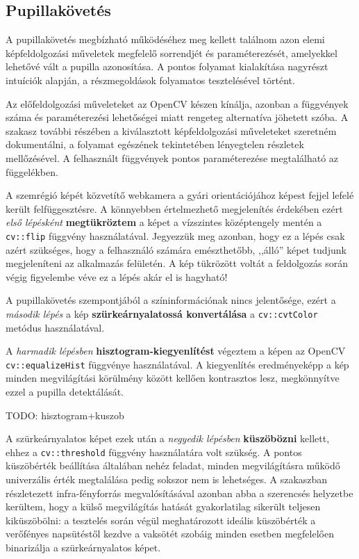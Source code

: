 \subsection{Pupillakövetés}\label{sect:pupillakov}

A pupillakövetés megbízható működéséhez meg kellett találnom azon elemi képfeldolgozási műveletek megfelelő sorrendjét és paraméterezését, amelyekkel lehetővé vált a pupilla azonosítása. A pontos folyamat kialakítása nagyrészt intuíciók alapján, a részmegoldások folyamatos tesztelésével történt.

Az előfeldolgozási műveleteket az OpenCV készen kínálja, azonban a függvények száma és paraméterezési lehetőségei miatt rengeteg alternatíva jöhetett szóba. A szakasz további részében a kiválasztott képfeldolgozási műveleteket szeretném dokumentálni, a folyamat egészének tekintetében lényegtelen részletek mellőzésével. A felhasznált függvények pontos paraméterezése megtalálható az  függelékben.

\bigskip

A szemrégió képét közvetítő webkamera a gyári orientációjához képest fejjel lefelé került felfüggesztésre. A könnyebben értelmezhető megjelenítés érdekében ezért \emph{első lépésként} \textbf{megtükröztem} a képet a vízszintes középtengely mentén a \texttt{cv::flip} függvény használatával. Jegyezzük meg azonban, hogy ez a lépés csak azért szükséges, hogy a felhasználó számára emészthetőbb, ,,álló'' képet tudjunk megjeleníteni az alkalmazás felületén. A kép tükrözött voltát a feldolgozás során végig figyelembe véve ez a lépés akár el is hagyható!

A pupillakövetés szempontjából a színinformációnak nincs jelentősége, ezért a \emph{második lépés} a kép \textbf{szürkeárnyalatossá konvertálása} a \texttt{cv::cvtColor} metódus használatával.

A \emph{harmadik lépésben} \textbf{hisztogram-kiegyenlítést} végeztem a képen az OpenCV \texttt{cv::equalizeHist} függvénye használatával. A kiegyenlítés eredményeképp a kép minden megvilágítási körülmény között kellően kontrasztos lesz, megkönnyítve ezzel a pupilla detektálását.

TODO: hisztogram+kuszob

A szürkeárnyalatos képet ezek után a \emph{negyedik lépésben} \textbf{küszöbözni} kellett, ehhez a \texttt{cv::threshold} függvény használatára volt szükség. A pontos küszöbérték beállítása általában nehéz feladat, minden megvilágításra működő univerzális érték megtalálása pedig sokszor nem is lehetséges. A  szakaszban részletezett infra-fényforrás megvalósításával azonban abba a szerencsés helyzetbe kerültem, hogy a külső megvilágítás hatását gyakorlatilag sikerült teljesen kiküszöbölni: a tesztelés során végül meghatározott ideális küszöbérték a verőfényes napsütéstől kezdve a vaksötét szobáig minden esetben megfelelően binarizálja a szürkeárnyalatos képet.

